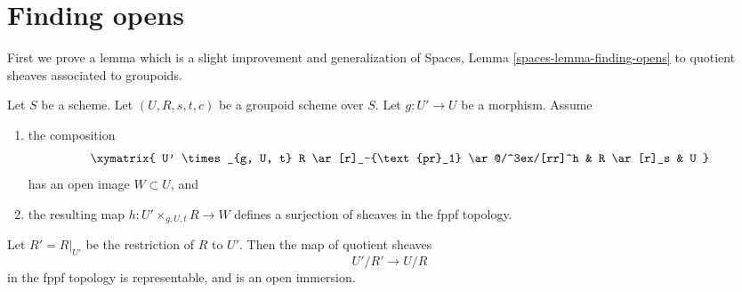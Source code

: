 \section{Finding opens}
\label{section-finding-opens}


\medskip\noindent
First we prove a lemma which is a slight improvement and generalization of
Spaces, Lemma \ref{spaces-lemma-finding-opens}
to quotient sheaves associated to groupoids.

\begin{lemma}
\label{lemma-better-finding-opens}
Let $S$ be a scheme.
Let $(U, R, s, t, c)$ be a groupoid scheme over $S$.
Let $g : U' \to U$ be a morphism.
Assume
\begin{enumerate}
\item the composition
$$
\xymatrix{
U' \times_{g, U, t} R \ar[r]_-{\text{pr}_1} \ar@/^3ex/[rr]^h
& R \ar[r]_s & U
}
$$
has an open image $W \subset U$, and
\item the resulting map $h : U' \times_{g, U, t} R \to W$
defines a surjection of sheaves in the fppf topology.
\end{enumerate}
Let $R' = R|_{U'}$ be the restriction of $R$ to $U'$. Then the map
of quotient sheaves
$$
U'/R' \to U/R
$$
in the fppf topology is representable, and is an open immersion.
\end{lemma}

